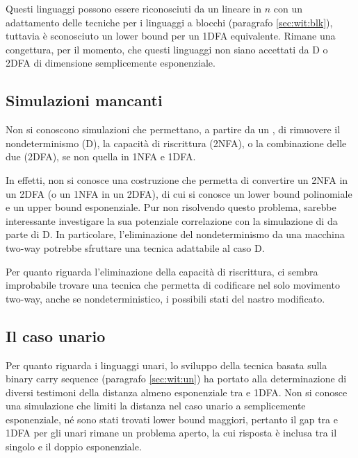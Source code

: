 Questi linguaggi possono essere riconosciuti da un  lineare in $n$ con un adattamento delle tecniche per i linguaggi a blocchi (paragrafo \ref{sec:wit:blk}), tuttavia è sconosciuto un lower bound per un 1DFA equivalente. Rimane una congettura, per il momento, che questi linguaggi non siano accettati da D o 2DFA di dimensione semplicemente esponenziale.


\subsection{Simulazioni mancanti}
Non si conoscono simulazioni che permettano, a partire da un , di rimuovere il nondeterminismo (\tto D), la capacità di riscrittura (\tto 2NFA), o la combinazione delle due (\tto 2DFA), se non quella in 1NFA e 1DFA.

In effetti, non si conosce una costruzione che permetta di convertire un 2NFA in un 2DFA (o un 1NFA in un 2DFA), di cui si conosce un lower bound polinomiale e un upper bound esponenziale. Pur non risolvendo questo problema, sarebbe interessante investigare la sua potenziale correlazione con la simulazione di  da parte di D. In particolare, l'eliminazione del nondeterminismo da una macchina two-way potrebbe sfruttare una tecnica adattabile al caso \tto D.

Per quanto riguarda l'eliminazione della capacità di riscrittura, ci sembra improbabile trovare una tecnica che permetta di codificare nel solo movimento two-way, anche se nondeterministico, i possibili stati del nastro modificato.


\subsection{Il caso unario}
Per quanto riguarda i linguaggi unari, lo sviluppo della tecnica basata sulla binary carry sequence (paragrafo \ref{sec:wit:un}) ha portato alla determinazione di diversi testimoni della distanza almeno esponenziale tra  e 1DFA. Non si conosce una simulazione che limiti la distanza nel caso unario a semplicemente esponenziale, né sono stati trovati lower bound maggiori, pertanto il gap tra  e 1DFA per gli unari rimane un problema aperto, la cui risposta è inclusa tra il singolo e il doppio esponenziale.

